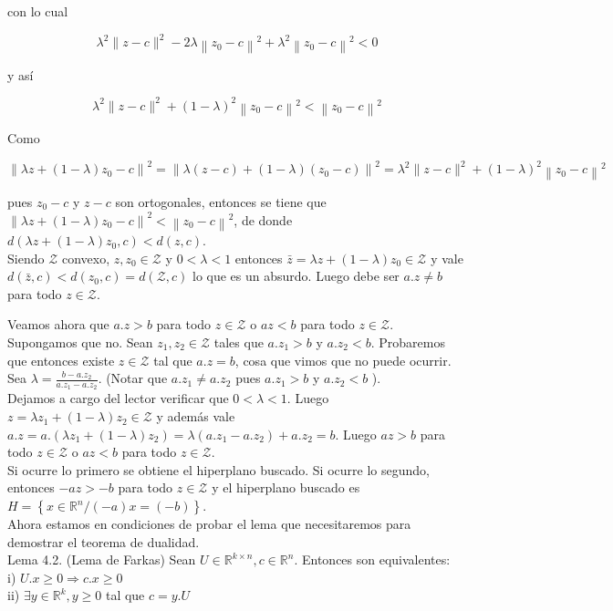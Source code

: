 \documentclass[10pt]{article}
\begin{document}
con lo cual

$$
\lambda^{2}\|z-c\|^{2}-2 \lambda\left\|z_{0}-c\right\|^{2}+\lambda^{2}\left\|z_{0}-c\right\|^{2}<0
$$

y así

$$
\lambda^{2}\|z-c\|^{2}+(1-\lambda)^{2}\left\|z_{0}-c\right\|^{2}<\left\|z_{0}-c\right\|^{2}
$$

Como

$$
\left\|\lambda z+(1-\lambda) z_{0}-c\right\|^{2}=\left\|\lambda(z-c)+(1-\lambda)\left(z_{0}-c\right)\right\|^{2}=\lambda^{2}\|z-c\|^{2}+(1-\lambda)^{2}\left\|z_{0}-c\right\|^{2}
$$

pues $z_{0}-c$ y $z-c$ son ortogonales, entonces se tiene que $\left\|\lambda z+(1-\lambda) z_{0}-c\right\|^{2}<\left\|z_{0}-c\right\|^{2}$, de donde $d\left(\lambda z+(1-\lambda) z_{0}, c\right)<d(z, c)$.\\
Siendo $\mathcal{Z}$ convexo, $z, z_{0} \in \mathcal{Z}$ y $0<\lambda<1$ entonces $\bar{z}=\lambda z+(1-\lambda) z_{0} \in \mathcal{Z}$ y vale $d(\bar{z}, c)<d\left(z_{0}, c\right)=d(\mathcal{Z}, c)$ lo que es un absurdo. Luego debe ser $a . z \neq b$ para todo $z \in \mathcal{Z}$.

Veamos ahora que $a . z>b$ para todo $z \in \mathcal{Z}$ o $a z<b$ para todo $z \in \mathcal{Z}$. Supongamos que no. Sean $z_{1}, z_{2} \in \mathcal{Z}$ tales que $a . z_{1}>b$ y $a . z_{2}<b$. Probaremos que entonces existe $z \in \mathcal{Z}$ tal que $a . z=b$, cosa que vimos que no puede ocurrir.\\
Sea $\lambda=\frac{b-a . z_{2}}{a . z_{1}-a . z_{2}}$. (Notar que $a . z_{1} \neq a . z_{2}$ pues $a . z_{1}>b$ y $a . z_{2}<b$ ).\\
Dejamos a cargo del lector verificar que $0<\lambda<1$. Luego $z=\lambda z_{1}+(1-\lambda) z_{2} \in \mathcal{Z}$ y además vale $a . z=a .\left(\lambda z_{1}+(1-\lambda) z_{2}\right)=\lambda\left(a . z_{1}-a . z_{2}\right)+a . z_{2}=b$. Luego $a z>b$ para todo $z \in \mathcal{Z}$ o $a z<b$ para todo $z \in \mathcal{Z}$.\\
Si ocurre lo primero se obtiene el hiperplano buscado. Si ocurre lo segundo, entonces $-a z>-b$ para todo $z \in \mathcal{Z}$ y el hiperplano buscado es $H=\left\{x \in \mathbb{R}^{n} /(-a) x=(-b)\right\}$.\\
Ahora estamos en condiciones de probar el lema que necesitaremos para demostrar el teorema de dualidad.\\
Lema 4.2. (Lema de Farkas) Sean $U \in \mathbb{R}^{k \times n}, c \in \mathbb{R}^{n}$. Entonces son equivalentes:\\
i) $U . x \geq 0 \Longrightarrow c . x \geq 0$\\
ii) $\exists y \in \mathbb{R}^{k}, y \geq 0$ tal que $c=y . U$
\end{document}
